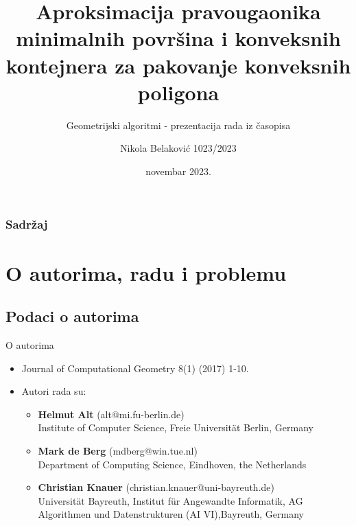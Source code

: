 \documentclass{beamer}
\title{Aproksimacija pravougaonika minimalnih površina i konveksnih kontejnera za pakovanje konveksnih poligona}
\subtitle{Geometrijski algoritmi - prezentacija rada iz časopisa}
\author[Nikola Belaković]{Nikola Belaković 1023/2023}
\institute[]{\\Matematički fakultet, Univerzitet u Beogradu}
\date[]{novembar 2023.}
\theoremstyle{plain}
\begin{document}
\begin{frame}
  \titlepage
\end{frame}

\begin{frame}\frametitle{Sadržaj}\tableofcontents
\end{frame} 

\section{O autorima, radu i problemu}
\subsection{Podaci o autorima}
\begin{frame}{O autorima}
    \begin{itemize}
        \item Journal of Computational Geometry 8(1) (2017) 1-10. 
        \item Autori rada su:
            \begin{itemize}  
                \item \textbf{Helmut Alt} (alt@mi.fu-berlin.de)\\
               Institute of Computer Science, Freie Universität Berlin, Germany\\
                \item \textbf{Mark de Berg} (mdberg@win.tue.nl)\\
                Department of Computing Science, Eindhoven, the Netherlands
                \item \textbf{Christian Knauer} (christian.knauer@uni-bayreuth.de)\\
                Universität Bayreuth, Institut für Angewandte Informatik, AG Algorithmen und Datenstrukturen (AI VI),Bayreuth, Germany     
            \end{itemize} 
    \end{itemize}
\end{frame}
\end{document}
